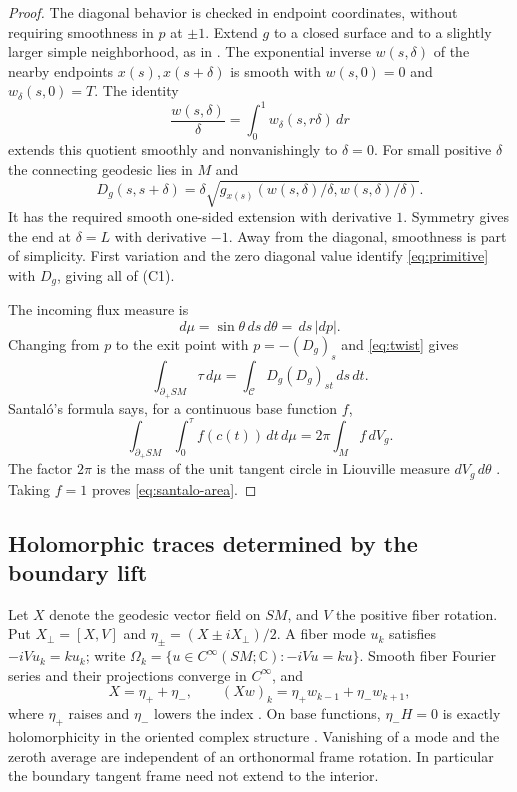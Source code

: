 \documentclass[11pt]{article}
\theoremstyle{remark}
\newcommand{\Cpair}{\mathcal C}
\newcommand{\dd}{\,d}
\begin{document}
\begin{proof}
The diagonal behavior is checked in endpoint coordinates, without
requiring smoothness in $p$ at $\pm1$. Extend $g$ to a closed surface
and to a slightly larger simple neighborhood, as in
\cite[Lemma~3.1.8 and Proposition~3.8.7]{PSU}.
The exponential inverse $w(s,\delta)$ of the nearby endpoints
$x(s),x(s+\delta)$ is smooth with $w(s,0)=0$ and
$w_\delta(s,0)=T$. The identity
\[
 \frac{w(s,\delta)}\delta
       =\int_0^1 w_\delta(s,r\delta)\dd r
\]
extends this quotient smoothly and nonvanishingly to $\delta=0$.
For small positive $\delta$ the connecting geodesic lies in $M$ and
\[
 D_g(s,s+\delta)
   =\delta\sqrt{g_{x(s)}(w(s,\delta)/\delta,w(s,\delta)/\delta)}.
\]
It has the required smooth one-sided extension with derivative $1$.
Symmetry gives the end at $\delta=L$ with derivative $-1$.
Away from the diagonal, smoothness is part of simplicity.
First variation and the zero diagonal value identify
\eqref{eq:primitive} with $D_g$, giving all of (C1).

The incoming flux measure is
\[
 d\mu=\sin\theta\dd s\dd\theta=\dd s\,|dp|.
\]
Changing from $p$ to the exit point with $p=-(D_g)_s$ and
\eqref{eq:twist} gives
\[
 \int_{\partial_+SM}\tau\dd\mu
     =\int_{\Cpair}D_g(D_g)_{st}\dd s\dd t.
\]
Santal\'o's formula \cite[Proposition~3.6.6]{PSU} says, for a continuous
base function $f$,
\begin{equation}\label{eq:santalo}
 \int_{\partial_+SM}\int_0^\tau f(c(t))\dd t\dd\mu
       =2\pi\int_M f\dd V_g.
\end{equation}
The factor $2\pi$ is the mass of the unit tangent circle in Liouville
measure $dV_g\,d\theta$ \cite[Section~3.5.2]{PSU}.
Taking $f=1$ proves \eqref{eq:santalo-area}.
\end{proof}

\subsection{Holomorphic traces determined by the boundary lift}
Let $X$ denote the geodesic vector field on $SM$, and $V$ the positive
fiber rotation. Put $X_\perp=[X,V]$ and
$\eta_\pm=(X\pm iX_\perp)/2$. A fiber mode $u_k$ satisfies
$-iVu_k=ku_k$; write
$\Omega_k=\{u\in C^\infty(SM;\mathbb C):-iVu=ku\}$.
Smooth fiber Fourier series and their projections converge
in $C^\infty$, and
\begin{equation}\label{eq:mode-operators}
 X=\eta_++\eta_-,\qquad
 (Xw)_k=\eta_+w_{k-1}+\eta_-w_{k+1},
\end{equation}
where $\eta_+$ raises and $\eta_-$ lowers the index
\cite[Lemmas~6.1.3 and 6.1.5]{PSU}. On base functions,
$\eta_-H=0$ is exactly holomorphicity in the oriented complex structure
\cite[Lemma~6.1.21]{PSU}. Vanishing of a mode and the zeroth average
are independent of an orthonormal frame rotation. In particular the
boundary tangent frame need not extend to the interior.
\end{document}
